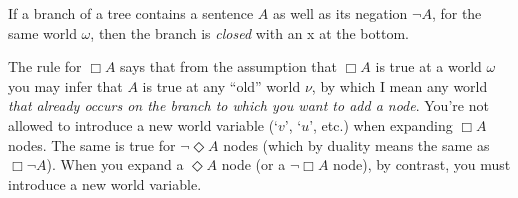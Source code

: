 \vspace{10mm}\noindent%
\begin{minipage}{0.33\textwidth}\centering
{}
\end{minipage}
\begin{minipage}{0.33\textwidth}\centering
{}
\end{minipage}
\begin{minipage}{0.33\textwidth}\centering
{}
\end{minipage}

\vspace{10mm}\noindent%
\begin{minipage}{0.33\textwidth}\centering
{}
\end{minipage}

\vspace{5mm}

If a branch of a tree contains a sentence $A$ as well as its negation $\neg A$,
for the same world $\omega$, then the branch is \emph{closed} with an {\sffamily
  x} at the bottom.

The rule for $\Box A$ says that from the assumption that $\Box A$ is true at a
world $\omega$ you may infer that $A$ is true at any ``old'' world $\nu$, by
which I mean any world \emph{that already occurs on the branch to which you want to add a node}. You're not allowed to introduce a new world variable (`$v$',
`$u$', etc.) when expanding $\Box A$ nodes. The same is true for
$\neg \Diamond A$ nodes (which by duality means the same as $\Box \neg A$). When
you expand a $\Diamond A$ node (or a $\neg \Box A$ node), by contrast, you must
introduce a new world variable.

